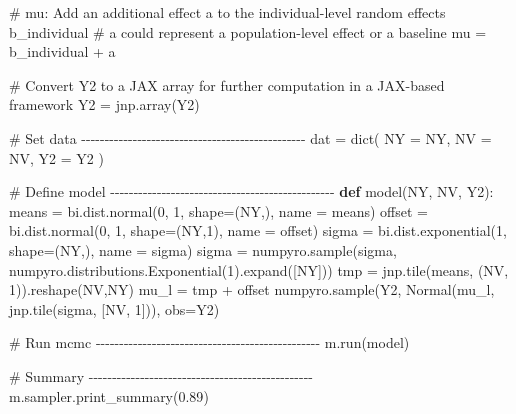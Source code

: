 \documentclass[
  letterpaper,
  DIV=11,
  numbers=noendperiod]{scrreprt}
\newenvironment{Shaded}{\begin{snugshade}}{\end{snugshade}}
\newcommand{\BuiltInTok}[1]{\textcolor[rgb]{0.00,0.23,0.31}{#1}}
\newcommand{\CommentTok}[1]{\textcolor[rgb]{0.37,0.37,0.37}{#1}}
\newcommand{\DecValTok}[1]{\textcolor[rgb]{0.68,0.00,0.00}{#1}}
\newcommand{\FloatTok}[1]{\textcolor[rgb]{0.68,0.00,0.00}{#1}}
\newcommand{\KeywordTok}[1]{\textcolor[rgb]{0.00,0.23,0.31}{\textbf{#1}}}
\newcommand{\NormalTok}[1]{\textcolor[rgb]{0.00,0.23,0.31}{#1}}
\newcommand{\OperatorTok}[1]{\textcolor[rgb]{0.37,0.37,0.37}{#1}}
\newcommand{\StringTok}[1]{\textcolor[rgb]{0.13,0.47,0.30}{#1}}
\begin{document}
\begin{Shaded}
\begin{Highlighting}[]
\CommentTok{\# mu: Add an additional effect \textquotesingle{}a\textquotesingle{} to the individual{-}level random effects \textquotesingle{}b\_individual\textquotesingle{}}
\CommentTok{\# \textquotesingle{}a\textquotesingle{} could represent a population{-}level effect or a baseline}
\NormalTok{mu }\OperatorTok{=}\NormalTok{ b\_individual }\OperatorTok{+}\NormalTok{ a}

\CommentTok{\# Convert Y2 to a JAX array for further computation in a JAX{-}based framework}
\NormalTok{Y2 }\OperatorTok{=}\NormalTok{ jnp.array(Y2)}


\CommentTok{\# Set data {-}{-}{-}{-}{-}{-}{-}{-}{-}{-}{-}{-}{-}{-}{-}{-}{-}{-}{-}{-}{-}{-}{-}{-}{-}{-}{-}{-}{-}{-}{-}{-}{-}{-}{-}{-}{-}{-}{-}{-}{-}{-}{-}{-}{-}{-}{-}{-}}
\NormalTok{dat }\OperatorTok{=} \BuiltInTok{dict}\NormalTok{(}
\NormalTok{    NY }\OperatorTok{=}\NormalTok{ NY,}
\NormalTok{    NV }\OperatorTok{=}\NormalTok{ NV,}
\NormalTok{    Y2 }\OperatorTok{=}\NormalTok{ Y2}
\NormalTok{)}

\CommentTok{\# Define model {-}{-}{-}{-}{-}{-}{-}{-}{-}{-}{-}{-}{-}{-}{-}{-}{-}{-}{-}{-}{-}{-}{-}{-}{-}{-}{-}{-}{-}{-}{-}{-}{-}{-}{-}{-}{-}{-}{-}{-}{-}{-}{-}{-}{-}{-}{-}{-}}
\KeywordTok{def}\NormalTok{ model(NY, NV, Y2):}
\NormalTok{    means }\OperatorTok{=}\NormalTok{ bi.dist.normal(}\DecValTok{0}\NormalTok{, }\DecValTok{1}\NormalTok{, shape}\OperatorTok{=}\NormalTok{(NY,), name }\OperatorTok{=} \StringTok{\textquotesingle{}means\textquotesingle{}}\NormalTok{)}
\NormalTok{    offset }\OperatorTok{=}\NormalTok{ bi.dist.normal(}\DecValTok{0}\NormalTok{, }\DecValTok{1}\NormalTok{, shape}\OperatorTok{=}\NormalTok{(NY,}\DecValTok{1}\NormalTok{), name }\OperatorTok{=} \StringTok{\textquotesingle{}offset\textquotesingle{}}\NormalTok{)}
\NormalTok{    sigma }\OperatorTok{=}\NormalTok{ bi.dist.exponential(}\DecValTok{1}\NormalTok{, shape}\OperatorTok{=}\NormalTok{(NY,), name }\OperatorTok{=} \StringTok{\textquotesingle{}sigma\textquotesingle{}}\NormalTok{)}
\NormalTok{    sigma }\OperatorTok{=}\NormalTok{  numpyro.sample(}\StringTok{\textquotesingle{}sigma\textquotesingle{}}\NormalTok{, numpyro.distributions.Exponential(}\DecValTok{1}\NormalTok{).expand([NY])) }
\NormalTok{    tmp }\OperatorTok{=}\NormalTok{ jnp.tile(means, (NV, }\DecValTok{1}\NormalTok{)).reshape(NV,NY)  }
\NormalTok{    mu\_l }\OperatorTok{=}\NormalTok{ tmp }\OperatorTok{+}\NormalTok{ offset }
\NormalTok{    numpyro.sample(}\StringTok{\textquotesingle{}Y2\textquotesingle{}}\NormalTok{, Normal(mu\_l, jnp.tile(sigma, [NV, }\DecValTok{1}\NormalTok{])), obs}\OperatorTok{=}\NormalTok{Y2)}

\CommentTok{\# Run mcmc {-}{-}{-}{-}{-}{-}{-}{-}{-}{-}{-}{-}{-}{-}{-}{-}{-}{-}{-}{-}{-}{-}{-}{-}{-}{-}{-}{-}{-}{-}{-}{-}{-}{-}{-}{-}{-}{-}{-}{-}{-}{-}{-}{-}{-}{-}{-}{-}}
\NormalTok{m.run(model) }

\CommentTok{\# Summary {-}{-}{-}{-}{-}{-}{-}{-}{-}{-}{-}{-}{-}{-}{-}{-}{-}{-}{-}{-}{-}{-}{-}{-}{-}{-}{-}{-}{-}{-}{-}{-}{-}{-}{-}{-}{-}{-}{-}{-}{-}{-}{-}{-}{-}{-}{-}{-}}
\NormalTok{m.sampler.print\_summary(}\FloatTok{0.89}\NormalTok{)}
\end{Highlighting}
\end{Shaded}
\end{document}
